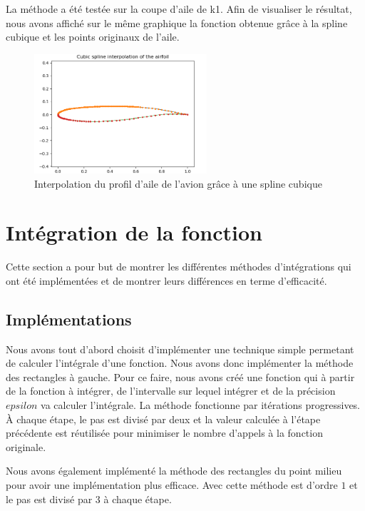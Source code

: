 \documentclass{article}
\begin{document}
La méthode a été testée sur la coupe d'aile de k1. Afin de visualiser le résultat, nous avons affiché sur le même graphique la fonction obtenue grâce à la spline cubique et les points originaux de l'aile.

\begin{figure}[!htb]
    \centering
    \includegraphics[width=0.57\textwidth]{airfoil.png}
    \caption{Interpolation du profil d'aile de l'avion grâce à une spline cubique}
    \label{airfoil_profil}
\end{figure}


\section{Intégration de la fonction}

Cette section a pour but de montrer les différentes méthodes d'intégrations qui ont été implémentées et de montrer leurs différences en terme d'efficacité.

\subsection{Implémentations}

Nous avons tout d'abord choisit d'implémenter une technique simple permetant de calculer l'intégrale d'une fonction. Nous avons donc implémenter la méthode des rectangles à gauche.
Pour ce faire, nous avons créé une fonction qui à partir de la fonction à intégrer, de l'intervalle sur lequel intégrer et de la précision $epsilon$ va calculer l'intégrale. La méthode fonctionne par itérations progressives. À chaque étape, le pas est divisé par deux et la valeur calculée à l'étape précédente est réutilisée pour minimiser le nombre d'appels à la fonction originale.

Nous avons également implémenté la méthode des rectangles du point milieu pour avoir une implémentation plus efficace. Avec cette méthode est d'ordre $1$ et le pas est divisé par 3 à chaque étape.
\end{document}
